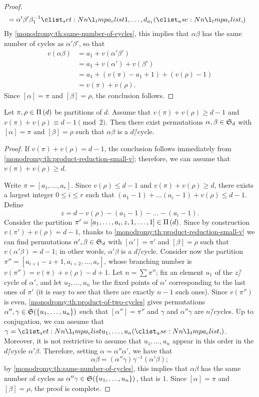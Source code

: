 \begin{proof}
\begin{align*}
&=\alpha'\beta'\beta_1^{-1}\cycle{1,\ldots,d_{a_1}}
\end{align*}
By \cref{monodromy:th:same-number-of-cycles}, this implies that $\alpha\beta$ has the same number of cycles as $\alpha'\beta'$, so that
\begin{align*}
v(\alpha\beta)&=a_1+v(\alpha'\beta')\\
&=a_1+v(\alpha')+v(\beta')\\
&=a_1+(v(\pi)-a_1+1)+(v(\rho)-1)\\
&=v(\pi)+v(\rho).
\end{align*}
Since $[\alpha]=\pi$ and $[\beta]=\rho$, the conclusion follows.
\end{proof}

\begin{proposition}\label{monodromy:th:product-reduction-odd}
Let $\pi,\rho\in\Pi\left(d\right)$ be partitions of $d$. Assume that $v(\pi)+v(\rho)\ge d-1$ and $v(\pi)+v(\rho)\equiv d-1\pmod{2}$. Then there exist permutations $\alpha,\beta\in\symgroup[d]$ with $[\alpha]=\pi$ and $[\beta]=\rho$ such that $\alpha\beta$ is a $d$\=/cycle.
\end{proposition}
\begin{proof}
If $v(\pi)+v(\rho)=d-1$, the conclusion follows immediately from \cref{monodromy:th:product-reduction-small-v}; therefore, we can assume that $v(\pi)+v(\rho)\ge d$.

Write $\pi=[a_1,\ldots,a_r]$. Since $v(\rho)\le d-1$ and $v(\pi)+v(\rho)\ge d$, there exists a largest integer $0\le i\le r$ such that $(a_1-1)+\ldots(a_i-1)+v(\rho)\le d-1$. Define
\[
z=d-v(\rho)-(a_1-1)-\ldots-(a_i-1).
\]
Consider the partition $\pi'=[a_1,\ldots,a_i,z,1,\ldots,1]\in\Pi\left(d\right)$. Since by construction $v(\pi')+v(\rho)=d-1$, thanks to \cref{monodromy:th:product-reduction-small-v} we can find permutations $\alpha',\beta\in\symgroup[d]$ with $[\alpha']=\pi'$ and $[\beta]=\rho$ such that $v(\alpha'\beta)=d-1$; in other words, $\alpha'\beta$ is a $d$\=/cycle. Consider now the partition $\pi''=[a_{i+1}-z+1,a_{i+2},\ldots,a_r]$, whose branching number is $v(\pi'')=v(\pi)+v(\rho)-d+1$. Let $n=\sum\pi''$; fix an element $u_1$ of the $z$\=/cycle of $\alpha'$, and let $u_2,\ldots,u_n$ be the fixed points of $\alpha'$ corresponding to the last ones of $\pi'$ (it is easy to see that there are exactly $n-1$ such ones). Since $v(\pi'')$ is even, \cref{monodromy:th:product-of-two-cycles} gives permutations $\alpha'',\gamma\in\symgroup(\{u_1,\ldots,u_n\})$ such that $[\alpha'']=\pi''$ and $\gamma$ and $\alpha''\gamma$ are $n$\=/cycles. Up to conjugation, we can assume that $\gamma=\cycle{u_1,\ldots,u_n}$. Moreover, it is not restrictive to assume that $u_1,\ldots,u_n$ appear in this order in the $d$\=/cycle $\alpha'\beta$. Therefore, setting $\alpha=\alpha''\alpha'$, we have that
\[
\alpha\beta=(\alpha''\gamma)\gamma^{-1}(\alpha'\beta);
\]
by \cref{monodromy:th:same-number-of-cycles}, this implies that $\alpha\beta$ has the same number of cycles as $\alpha''\gamma\in\symgroup(\{u_1,\ldots,u_n\})$, that is $1$. Since $[\alpha]=\pi$ and $[\beta]=\rho$, the proof is complete.
\end{proof}


